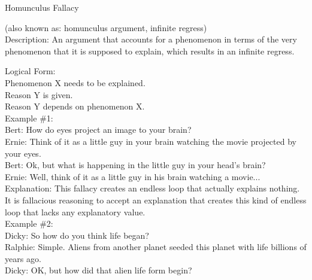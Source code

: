 \documentclass[a4paper,12pt,single,pdftex]{scrbook}
\begin{document}
Homunculus Fallacy
    
      (also known as: homunculus argument, infinite regress)
    \\

  
    Description: An argument that accounts for a phenomenon in terms of the very phenomenon that it is supposed to explain, which results in an infinite regress.

    
      Logical Form:
    \\

    
      Phenomenon X needs to be explained.
    \\

    
      Reason Y is given.
    \\

    
      Reason Y depends on phenomenon X.
    \\

    
      Example \#1:
    \\

    
      Bert: How do eyes project an image to your brain?
    \\

    
      Ernie: Think of it as a little guy in your brain watching the movie projected by your eyes.
    \\

    
      Bert: Ok, but what is happening in the little guy in your head’s brain?
    \\

    
      Ernie: Well, think of it as a little guy in his brain watching a movie...
    \\

    
      Explanation: This fallacy creates an endless loop that actually explains nothing.  It is fallacious reasoning to accept an explanation that creates this kind of endless loop that lacks any explanatory value.
    \\

    
      Example \#2:
    \\

    
      Dicky: So how do you think life began?
    \\

    
      Ralphie: Simple.  Aliens from another planet seeded this planet with life billions of years ago.
    \\

    
      Dicky: OK, but how did that alien life form begin?
    \\
\end{document}
